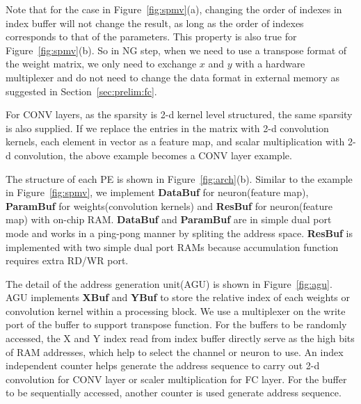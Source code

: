 Note that for the case in Figure~\ref{fig:spmv}(a), changing the order of indexes in index buffer will not change the result, as long as the order of indexes corresponds to that of the parameters. This property is also true for Figure~\ref{fig:spmv}(b). So in NG step, when we need to use a transpose format of the weight matrix, we only need to exchange $x$ and $y$ with a hardware multiplexer and do not need to change the data format in external memory as suggested in Section~\ref{sec:prelim:fc}. 

For CONV layers, as the sparsity is 2-d kernel level structured, the same sparsity is also supplied. If we replace the entries in the matrix with 2-d convolution kernels, each element in vector as a feature map, and scalar multiplication with 2-d convolution, the above example becomes a CONV layer example.

The structure of each PE is shown in Figure~\ref{fig:arch}(b). Similar to the example in Figure~\ref{fig:spmv}, we implement {\bf{DataBuf}} for neuron(feature map), {\bf{ParamBuf}} for weights(convolution kernels) and {\bf{ResBuf}} for neuron(feature map) with on-chip RAM. {\bf{DataBuf}} and {\bf{ParamBuf}} are in simple dual port mode and works in a ping-pong manner by spliting the address space. {\bf{ResBuf}} is implemented with two simple dual port RAMs because accumulation function requires extra RD/WR port.

The detail of the address generation unit(AGU) is shown in Figure~\ref{fig:agu}. AGU implements {\bf{XBuf}} and {\bf{YBuf}} to store the relative index of each weights or convolution kernel within a processing block. We use a multiplexer on the write port of the buffer to support transpose function. For the buffers to be randomly accessed, the X and Y index read from index buffer directly serve as the high bits of RAM addresses, which help to select the channel or neuron to use. An index independent counter helps generate the address sequence to carry out 2-d convolution for CONV layer or scaler multiplication for FC layer. For the buffer to be sequentially accessed, another counter is used generate address sequence.

